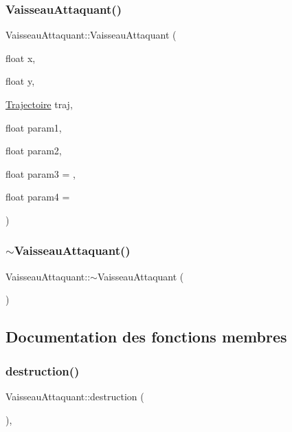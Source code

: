 \subsubsection{\texorpdfstring{Vaisseau\+Attaquant()}{VaisseauAttaquant()}}
{\footnotesize\ttfamily Vaisseau\+Attaquant\+::\+Vaisseau\+Attaquant (\begin{DoxyParamCaption}\item[{float}]{x,  }\item[{float}]{y,  }\item[{\hyperlink{_trajectoire_8h_afa7f6e8323d7ee755d93cd1f6019dd95}{Trajectoire}}]{traj,  }\item[{float}]{param1,  }\item[{float}]{param2,  }\item[{float}]{param3 = {},  }\item[{float}]{param4 = {} }\end{DoxyParamCaption})}

\mbox{\label{class_vaisseau_attaquant_a2707dcc90692ba6132ec6aeb659d3620}} 
\subsubsection{\texorpdfstring{$\sim$\+Vaisseau\+Attaquant()}{~VaisseauAttaquant()}}
{\footnotesize\ttfamily Vaisseau\+Attaquant\+::$\sim$\+Vaisseau\+Attaquant (\begin{DoxyParamCaption}{ }\end{DoxyParamCaption})}



\subsection{Documentation des fonctions membres}
\mbox{\label{class_vaisseau_attaquant_af804e1fd491301c2385e10d88f4892a6}} 
\subsubsection{\texorpdfstring{destruction()}{destruction()}}
{\footnotesize\ttfamily Vaisseau\+Attaquant\+::destruction (\begin{DoxyParamCaption}{ }\end{DoxyParamCaption})\hspace{0.3cm}{\ttfamily [inline]}, {\ttfamily [virtual]}}



